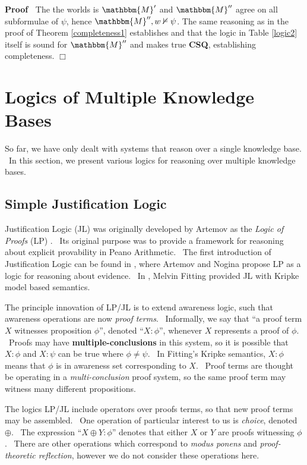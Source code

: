 \documentclass{acmconf}
\newcommand{\tmem}[1]{{\em #1\/}}
\newcommand{\tmstrong}[1]{\textbf{#1}}
\newcommand{\tmtextbf}[1]{{\bfseries{#1}}}
\newcommand{\tmtextit}[1]{{\itshape{#1}}}
\newenvironment{proof}{\noindent\textbf{Proof\ }}{\hspace*{\fill}$\Box$\medskip}
\begin{document}
\begin{proof}
  The the worlds is $\mathbbm{M}'$ and $\mathbbm{M}''$ agree on all
  subformulae of $\psi$, hence $\mathbbm{M}'', w \nvDash \psi$. The same
  reasoning as in the proof of Theorem \ref{completeness1} establishes and
  that the logic in Table \ref{logic2} itself is sound for $\mathbbm{M}''$ and
  makes true \tmtextbf{CSQ}, establishing completeness.
\end{proof}

\section{Logics of Multiple Knowledge Bases}

So far, we have only dealt with systems that reason over a single knowledge
base. \ In this section, we present various logics for reasoning over multiple
knowledge bases.

\subsection{Simple Justification Logic}

Justification Logic (JL) was originally developed by Artemov as the
\tmtextit{Logic of Proofs} (LP) {\cite{artemov_logic_1994}}. \ Its original
purpose was to provide a framework for reasoning about explicit provability in
Peano Arithmetic. \ The first introduction of Justification Logic can be found
in {\cite{artemov_introducing_2005}}, where Artemov and Nogina propose LP as a
logic for reasoning about evidence. \ In {\cite{fitting_logic_2005}}, Melvin
Fitting provided JL with Kripke model based semantics.



The principle innovation of LP/JL is to extend awareness logic, such that
awareness operations are now \tmtextit{proof terms}. \ Informally, we say that
``a proof term $X$ witnesses proposition $\phi$'', denoted ``$X : \phi$'',
whenever $X$ represents a proof of $\phi$. \ Proofs may have
{\tmstrong{multiple-conclusions}} in this system, so it is possible that $X :
\phi$ and $X : \psi$ can be true where $\phi \neq \psi$. \ In Fitting's Kripke
semantics, $X : \phi$ means that $\phi$ is in awareness set corresponding to
$X$. \ Proof terms are thought be operating in a \tmtextit{multi-conclusion}
proof system, so the same proof term may witness many different propositions.



The logics LP/JL include operators over proofs terms, so that new proof terms
may be assembled. \ One operation of particular interest to us is
{\tmem{choice}}, denoted $\oplus$. \ The expression ``$X \oplus Y : \phi$''
denotes that either $X$ or $Y$ are proofs witnessing $\phi$. \ There are other
operations which correspond to \tmtextit{modus ponens} and
\tmtextit{proof-theoretic reflection}, however we do not consider these
operations here.
\end{document}
